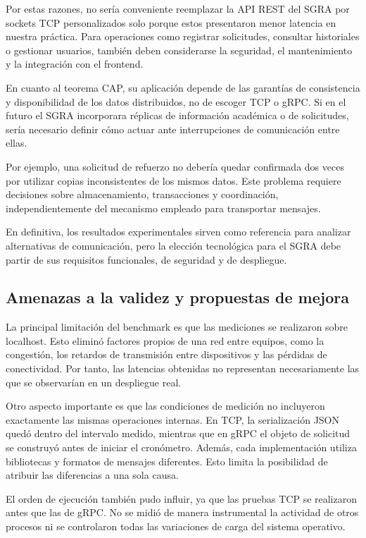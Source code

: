 Por estas razones, no sería conveniente reemplazar
la API REST del SGRA por sockets TCP personalizados
solo porque estos presentaron menor latencia en
nuestra práctica. Para operaciones como registrar
solicitudes, consultar historiales o gestionar
usuarios, también deben considerarse la seguridad,
el mantenimiento y la integración con el frontend.

En cuanto al teorema CAP, su aplicación depende
de las garantías de consistencia y disponibilidad
de los datos distribuidos, no de escoger TCP
o gRPC. Si en el futuro el SGRA incorporara
réplicas de información académica o de solicitudes,
sería necesario definir cómo actuar ante
interrupciones de comunicación entre ellas.

Por ejemplo, una solicitud de refuerzo no debería
quedar confirmada dos veces por utilizar copias
inconsistentes de los mismos datos. Este problema
requiere decisiones sobre almacenamiento,
transacciones y coordinación, independientemente
del mecanismo empleado para transportar mensajes.

En definitiva, los resultados experimentales
sirven como referencia para analizar alternativas
de comunicación, pero la elección tecnológica
para el SGRA debe partir de sus requisitos
funcionales, de seguridad y de despliegue.

\subsection{Amenazas a la validez y propuestas de mejora}

La principal limitación del benchmark es que las
mediciones se realizaron sobre localhost. Esto
eliminó factores propios de una red entre equipos,
como la congestión, los retardos de transmisión
entre dispositivos y las pérdidas de conectividad.
Por tanto, las latencias obtenidas no representan
necesariamente las que se observarían en un
despliegue real.

Otro aspecto importante es que las condiciones
de medición no incluyeron exactamente las mismas
operaciones internas. En TCP, la serialización
JSON quedó dentro del intervalo medido, mientras
que en gRPC el objeto de solicitud se construyó
antes de iniciar el cronómetro. Además, cada
implementación utiliza bibliotecas y formatos
de mensajes diferentes. Esto limita la posibilidad
de atribuir las diferencias a una sola causa.

El orden de ejecución también pudo influir,
ya que las pruebas TCP se realizaron antes
que las de gRPC. No se midió de manera
instrumental la actividad de otros procesos
ni se controlaron todas las variaciones
de carga del sistema operativo.

